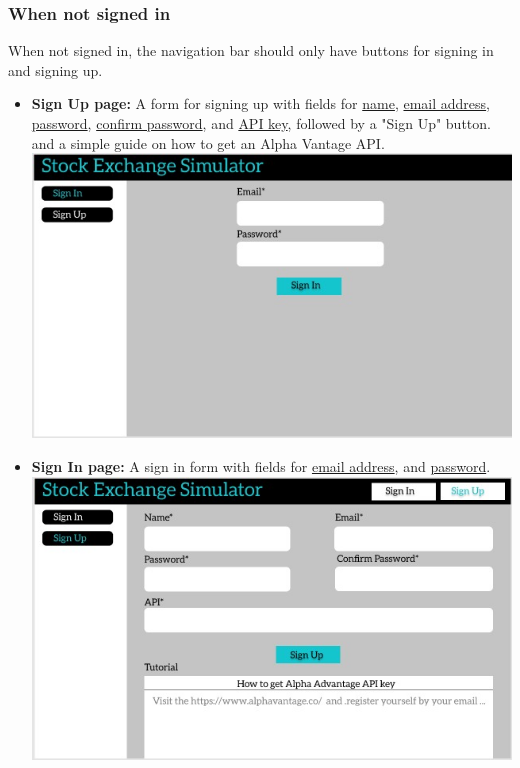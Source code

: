 \documentclass[12 pt, a4paper]{report}
\begin{document}
	\subsubsection{When not signed in}
	When not signed in, the navigation bar should only have buttons for signing in and signing up.
	\begin{itemize}
		\item \textbf{Sign Up page:} A form for signing up with fields for \underline{name}, \underline{email address}, \underline{password}, \underline{confirm password}, and \underline{API key}, followed by a "Sign Up" button. and a simple guide on how to get an Alpha Vantage API.\\
		\includegraphics[scale=0.5,keepaspectratio]{signin}
		\item \textbf{Sign In page:} A sign in form with fields for \underline{email address}, and \underline{password}.\\
		\includegraphics[scale=0.5,keepaspectratio]{signup}
	\end{itemize}
\end{document}

